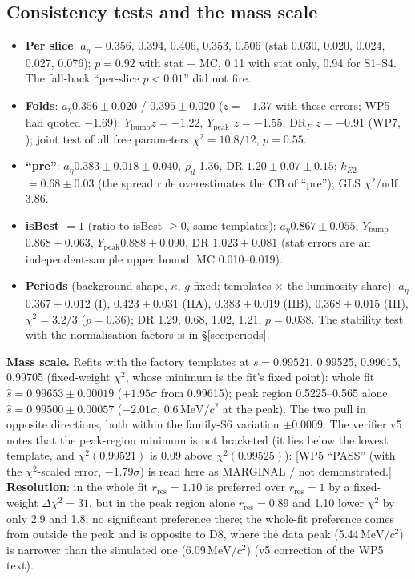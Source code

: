 \documentclass[11pt,a4paper]{article}
\newcommand{\MeVcc}{\ensuremath{\mathrm{MeV}/c^{2}}\xspace}
\newcommand{\code}[1]{\texttt{\detokenize{#1}}}
\newcommand{\aEta}{\ensuremath{a_\eta}\xspace}
\newcommand{\Ybump}{\ensuremath{Y_{\mathrm{bump}}}\xspace}
\newcommand{\Ypeak}{\ensuremath{Y_{\mathrm{peak}}}\xspace}
\newcommand{\rhod}{\ensuremath{\rho_d}\xspace}
\newcommand{\kEtwo}{\ensuremath{k_{E2}}\xspace}
\newcommand{\flag}[1]{\textcolor{red!60!black}{[#1]}}
\begin{document}
\subsection{Consistency tests and the mass scale}
\label{sec:cons}
\begin{itemize}\setlength{\itemsep}{0pt}
\item \textbf{Per slice}: \aEta $=0.356$, 0.394, 0.406, 0.353, 0.506 (stat 0.030, 0.020, 0.024, 0.027, 0.076); $p=0.92$ with stat + MC,
      0.11 with stat only, 0.94 for S1--S4. The fall-back ``per-slice $p<0.01$'' did not fire.
\item \textbf{Folds}: \aEta $0.356\pm0.020$ / $0.395\pm0.020$ ($z=-1.37$ with these errors; WP5 had quoted $-1.69$); \Ybump $z=-1.22$, \Ypeak
      $z=-1.55$, DR$_F$ $z=-0.91$ (WP7, \code{wp7_tests.txt}); joint test of all free parameters $\chi^2=10.8/12$, $p=0.55$.
\item \textbf{``pre''}: \aEta $0.383\pm0.018\pm0.040$, \rhod 1.36, DR $1.20\pm0.07\pm0.15$; \kEtwo $=0.68\pm0.03$ (the spread rule overestimates
      the CB of ``pre''); GLS $\chi^2$/ndf 3.86.
\item \textbf{isBest $=1$} (ratio to isBest $\ge0$, same templates): \aEta $0.867\pm0.055$, \Ybump $0.868\pm0.063$, \Ypeak $0.888\pm0.090$,
      DR $1.023\pm0.081$ (stat errors are an independent-sample upper bound; MC 0.010--0.019).
\item \textbf{Periods} (background shape, $\kappa$, $g$ fixed; templates $\times$ the luminosity share): \aEta $0.367\pm0.012$ (I),
      $0.423\pm0.031$ (IIA), $0.383\pm0.019$ (IIB), $0.368\pm0.015$ (III), $\chi^2=3.2/3$ ($p=0.36$); DR 1.29, 0.68, 1.02, 1.21, $p=0.038$. The
      stability test with the normalisation factors is in \S\ref{sec:periods}.
\end{itemize}

\label{sec:mscale}
\textbf{Mass scale.} Refits with the factory templates at $s=0.99521$, 0.99525, 0.99615, 0.99705 (fixed-weight $\chi^2$, whose minimum is the
fit's fixed point): whole fit $\hat s=0.99653\pm0.00019$ ($+1.95\sigma$ from 0.99615); peak region 0.5225--0.565 alone $\hat s=0.99500\pm0.00057$
($-2.01\sigma$, 0.6\,\MeVcc at the peak). The two pull in opposite directions, both within the family-S6 variation $\pm0.0009$. The verifier
v5 notes that the peak-region minimum is not bracketed (it lies below the lowest template, and $\chi^2(0.99521)$ is 0.09 above
$\chi^2(0.99525)$): \flag{WP5 ``PASS'' (with the $\chi^2$-scaled error, $-1.79\sigma$) is read here as MARGINAL / not demonstrated.}
\textbf{Resolution}: in the whole fit $r_{\mathrm{res}}=1.10$ is preferred over $r_{\mathrm{res}}=1$ by a fixed-weight $\Delta\chi^2=31$, but in the peak region alone
$r_{\mathrm{res}}=0.89$ and 1.10 lower $\chi^2$ by only 2.9 and 1.8: no significant preference there; the whole-fit preference comes from outside the
peak and is opposite to D8, where the data peak (5.44\,\MeVcc) is narrower than the simulated one (6.09\,\MeVcc) (v5 correction of the WP5
text).
\end{document}
